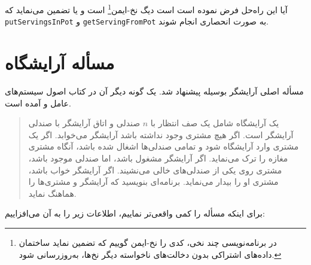 \documentclass{book}
\newcommand{\clearemptydoublepage}{\newpage\cleardoublepage}
\begin{document}
    آیا این راه‌حل فرض نموده است است دیگ نخ-ایمن\footnote{
    در برنامه‌نویسی چند نخی، کدی را نخ-ایمن گوییم که تضمین نماید ساختمان داده‌های اشتراکی بدون دخالت‌های ناخواسته دیگر نخ‌ها، به‌روزرسانی شود. 
    }  است و یا تضمین می‌نماید که  {\tt putServingsInPot} و {\tt getServingFromPot} 
    به صورت انحصاری انجام شوند.


\clearemptydoublepage
\section{مسأله آرایشگاه}

    مسأله اصلی آرایشگر بوسیله  پیشنهاد شد. یک گونه دیگر آن در کتاب اصول سیستم‌های عامل  و 
    آمده است. 

\begin {quotation}
    یک آرایشگاه شامل یک صف انتظار با $n$ صندلی و اتاق آرایشگر با صندلی آرایشگر است. اگر هیچ مشتری وجود نداشته باشد 
    آرایشگر می‌خوابد. اگر یک مشتری وارد آرایشگاه شود و تمامی صندلی‌ها اشغال شده باشد، آنگاه مشتری مغازه را ترک می‌نماید. 
    اگر آرایشگر مشغول باشد، اما صندلی موجود باشد، مشتری روی یکی از صندلی‌های خالی می‌نشیند. اگر آرایشگر خواب باشد، مشتری او را بیدار می‌نماید. 
    برنامه‌ای بنویسید که آرایشگر و مشتری‌ها را هماهنگ نماید. 
\end{quotation}

    برای اینکه مسأله را کمی واقعی‌تر نماییم، اطلاعات زیر را به آن می‌افزاییم: 
\end{document}
